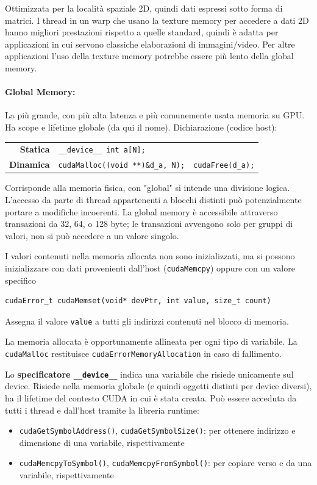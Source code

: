 Ottimizzata per la località spaziale 2D, quindi dati espressi sotto forma di matrici. I thread in un warp che usano la texture memory per accedere a dati 2D hanno migliori prestazioni rispetto a quelle standard, quindi è adatta per applicazioni in cui servono classiche elaborazioni di immagini/video. Per altre applicazioni l’uso della texture memory potrebbe essere più lento della global memory.

\paragraph{Global Memory:} La più grande, con più alta latenza e più comunemente usata memoria su GPU. Ha scope e lifetime globale (da qui il nome). Dichiarazione (codice host):
\begin{center}
	\begin{tabular}{r | l r | }
		\cline{2-3}
		\textbf{Statica} & \texttt{\_\_device\_\_ int a[N];} & \\
		\textbf{Dinamica} & \texttt{cudaMalloc((void **)\&d\_a, N);} & \texttt{cudaFree(d\_a);} \\
		\cline{2-3}
	\end{tabular}
\end{center}

Corrisponde alla memoria fisica, con "global" si intende una divisione logica. L'accesso da parte di thread appartenenti a blocchi distinti può potenzialmente portare a modifiche incoerenti. La global memory è accessibile attraverso transazioni da 32, 64, o 128 byte; le transazioni avvengono solo per gruppi di valori, non si può accedere a un valore singolo.

I valori contenuti nella memoria allocata non sono inizializzati, ma si possono inizializzare con dati provenienti dall'host (\texttt{cudaMemcpy}) oppure con un valore specifico
\begin{verbatim}
cudaError_t cudaMemset(void* devPtr, int value, size_t count)
\end{verbatim}

Assegna il valore \texttt{value} a tutti gli indirizzi contenuti nel blocco di memoria.

La memoria allocata è opportunamente allineata per ogni tipo di variabile. La \texttt{cudaMalloc} restituisce \texttt{cudaErrorMemoryAllocation} in caso di fallimento.

Lo \textbf{specificatore \texttt{\_\_device\_\_}} indica una variabile che risiede unicamente sul device. Risiede nella memoria globale (e quindi oggetti distinti per device diversi), ha il lifetime del contesto CUDA in cui è stata creata. Può essere acceduta da tutti i thread e dall'host tramite la libreria runtime:
\begin{itemize}
	\item \texttt{cudaGetSymbolAddress()}, \texttt{cudaGetSymbolSize()}: per ottenere indirizzo e dimensione di una variabile, rispettivamente
	
    \item \texttt{cudaMemcpyToSymbol()}, \texttt{cudaMemcpyFromSymbol()}: per copiare verso e da una variabile, rispettivamente
\end{itemize}

